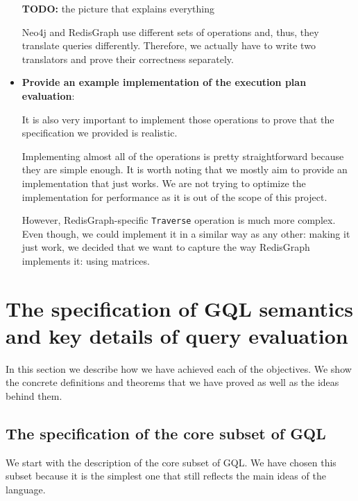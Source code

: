 \documentclass[14pt]{constructor-thesis}
\theoremstyle{definition}
\newcommand{\todo}[1]{
  \begin{tcolorbox}[colframe=red!75!black,colback=red!5!white,arc=0pt,fonttitle=\bfseries]
  \textbf{TODO:} #1
  \end{tcolorbox}
}
\begin{document}
\begin{itemize}
  \todo{the picture that explains everything}


  Neo4j and RedisGraph use different sets of operations and, thus, they translate queries differently. Therefore, we actually have to write two translators and prove their correctness separately.

  \item \textbf{Provide an example implementation of the execution plan evaluation}:
  
  It is also very important to implement those operations to prove that the specification we provided is realistic.
  
  Implementing almost all of the operations is pretty straightforward because they are simple enough. It is worth noting that we mostly aim to provide an implementation that just works. We are not trying to optimize the implementation for performance as it is out of the scope of this project.

  However, RedisGraph-specific \texttt{Traverse} operation is much more complex. Even though, we could implement it in a similar way as any other: making it just work, we decided that we want to capture the way RedisGraph implements it: using matrices. 
  

\end{itemize}

\section{The specification of GQL semantics and key details of query evaluation}
\label{sec:technical-details}

In this section we describe how we have achieved each of the objectives. We show the concrete definitions and theorems that we have proved as well as the ideas behind them.

\subsection{The specification of the core subset of GQL}

We start with the description of the core subset of GQL. We have chosen this subset because it is the simplest one that still reflects the main ideas of the language. 
\end{document}
